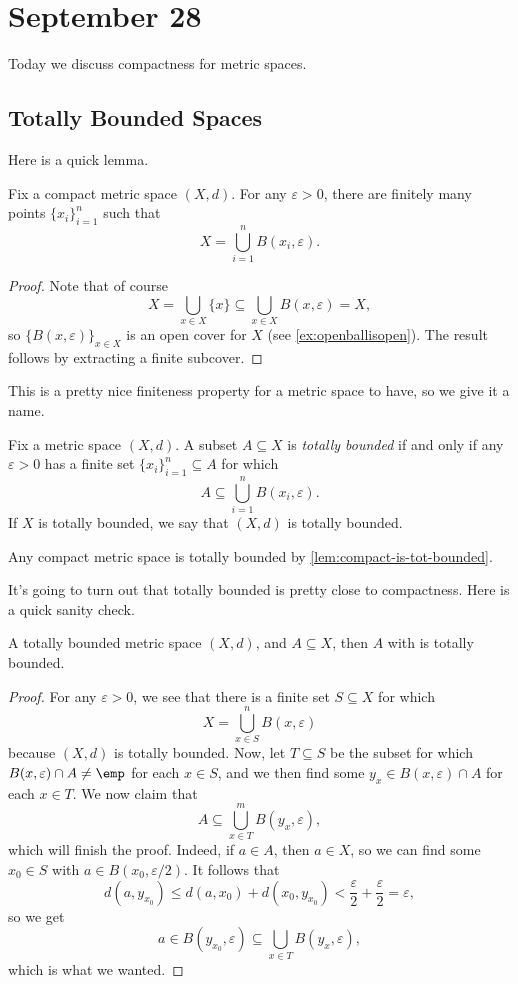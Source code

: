 \documentclass[../notes.tex]{subfiles}
\begin{document}
\section{September 28}

Today we discuss compactness for metric spaces.

\subsection{Totally Bounded Spaces}
Here is a quick lemma.
\begin{lemma} \label{lem:compact-is-tot-bounded}
	Fix a compact metric space $(X,d)$. For any $\varepsilon>0$, there are finitely many points $\{x_i\}_{i=1}^n$ such that
	\[X=\bigcup_{i=1}^nB(x_i,\varepsilon).\]
\end{lemma}
\begin{proof}
	Note that of course
	\[X=\bigcup_{x\in X}\{x\}\subseteq\bigcup_{x\in X}B(x,\varepsilon)=X,\]
	so $\{B(x,\varepsilon)\}_{x\in X}$ is an open cover for $X$ (see \autoref{ex:openballisopen}). The result follows by extracting a finite subcover.
\end{proof}
This is a pretty nice finiteness property for a metric space to have, so we give it a name.
\begin{definition}
	Fix a metric space $(X,d)$. A subset $A\subseteq X$ is \textit{totally bounded} if and only if any $\varepsilon>0$ has a finite set $\{x_i\}_{i=1}^n\subseteq A$ for which
	\[A\subseteq\bigcup_{i=1}^nB(x_i,\varepsilon).\]
	If $X$ is totally bounded, we say that $(X,d)$ is totally bounded.
\end{definition}
\begin{example}
	Any compact metric space is totally bounded by \autoref{lem:compact-is-tot-bounded}.
\end{example}
It's going to turn out that totally bounded is pretty close to compactness. Here is a quick sanity check.
\begin{lemma}
	A totally bounded metric space $(X,d)$, and $A\subseteq X$, then $A$ with is totally bounded.
\end{lemma}
\begin{proof}
	For any $\varepsilon>0$, we see that there is a finite set $S\subseteq X$ for which
	\[X=\bigcup_{x\in S}^nB(x,\varepsilon)\]
	because $(X,d)$ is totally bounded. Now, let $T\subseteq S$ be the subset for which $B(x,\varepsilon)\cap A\ne\emp$ for each $x\in S$, and we then find some $y_x\in B(x,\varepsilon)\cap A$ for each $x\in T$. We now claim that
	\[A\subseteq\bigcup_{x\in T}^mB(y_x,\varepsilon),\]
	which will finish the proof. Indeed, if $a\in A$, then $a\in X$, so we can find some $x_0\in S$ with $a\in B(x_0,\varepsilon/2)$. It follows that
	\[d(a,y_{x_0})\le d(a,x_0)+d(x_0,y_{x_0})<\frac\varepsilon2+\frac\varepsilon2=\varepsilon,\]
	so we get
	\[a\in B(y_{x_0},\varepsilon)\subseteq\bigcup_{x\in T}B(y_x,\varepsilon),\]
	which is what we wanted.
\end{proof}
\end{document}
